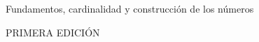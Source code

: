 
\begin{titlepage}
    \pagecolor{black}
    \color{white}

    \vspace*{\fill}
    \begin{flushright}
        {\fontsize{34}{40}\selectfont\bfseries \printbooktitle \par}
        \vspace{0.5cm}

        {\fontsize{13}{16}\selectfont Fundamentos, cardinalidad y construcción de los números \par}
    \end{flushright}

    \vspace*{\fill}

    \begin{flushright}
        {\fontsize{18}{22}\selectfont \printbookauthor \par}
        \vspace{0.3cm}

        {\fontsize{8}{10}\selectfont PRIMERA EDICIÓN \par}
        \vspace{0.2cm}
    \end{flushright}

    \vspace{2cm}

\end{titlepage}

\pagecolor{white}
\color{black}
